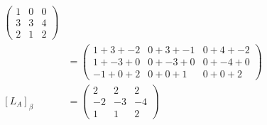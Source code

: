 \documentclass[13pt]{article}
\begin{document}
\begin{enumerate}[label=(\alph*),leftmargin=*]
\begin{align*}
\begin{pmatrix}
                    1 & 0 & 0 \\
                    3 & 3 & 4 \\
                    2 & 1 & 2
                  \end{pmatrix} \\
                &=
                  \begin{pmatrix}
                    1 + 3 + -2 & 0 + 3 + -1 & 0 + 4 + -2 \\
                    1 + -3 + 0 & 0 + -3 + 0 & 0 + -4 + 0 \\
                    -1 + 0 + 2 & 0 + 0 + 1 & 0 + 0 + 2
                  \end{pmatrix} \\
    [L_A]_\beta  &=
                  \begin{pmatrix}
                    2 & 2 & 2 \\
                    -2 & -3 & -4 \\
                    1 & 1 & 2
                  \end{pmatrix}
  \end{align*}


\end{enumerate}
\end{document}
